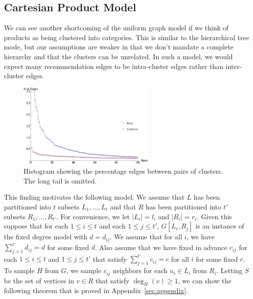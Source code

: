 \subsection{Cartesian Product Model}
\label{cartesian}
We can see another shortcoming of the uniform graph model if we think
of products as being clustered into categories. This is similar to the
hierarchical tree mode, but our assumptions are weaker in that we don't
mandate a complete hierarchy and that the clusters can be unrelated. In
such a model, we would expect many recommendation edges to be
intra-cluster edges rather than inter-cluster edges. 

\begin{figure}[h]
\centering
\includegraphics[width=0.6\textwidth]{images/cartesian_histogram.png}
\begin{minipage}[h]{0.7\textwidth}
\caption{Histogram showing the percentage edges between pairs of clusters. The long tail is omitted.}
\end{minipage}
\end{figure}

This finding motivates the following model. We assume that
$L$ has been partitioned into $t$ subsets $L_1,\ldots, L_t$ and
that $R$ has been partitioned into $t'$ subsets $R_1,\ldots,
R_{t'}$. For convenience, we let $|L_i| = l_i$ and $|R_i|=r_i$. Given
this suppose that for each $1\leq i\leq t$ and each $1\leq j\leq t'$,
$G[L_i, R_j]$ is an instance of the fixed degree model with
$d=d_{ij}$. We assume that for all $i$, we have $\sum_{j=1}^{t'}
d_{ij} = d$ for some fixed $d$. Also assume that we have fixed in
advance $c_{ij}$ for each $1\leq i\leq t$ and $1\leq j\leq t'$ that
satisfy $\sum_{j=1}^{t'} c_{ij} = c$ for all $i$ for some fixed $c$.
To sample $H$ from $G$, we sample $c_{ij}$ neighbors for each
$u_i\in L_i$ from $R_i$. Letting $S$ be the set of vertices in
$v\in R$ that satisfy $\deg_H(v)\geq 1$, we can show the following theorem
that is proved in Appendix~\ref{sec:appendix}.

